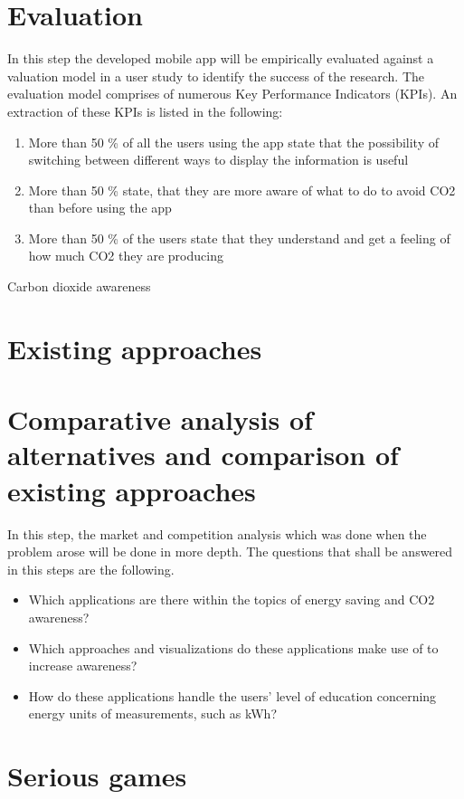 \section{Evaluation}
In this step the developed mobile app will be empirically evaluated against a valuation model in a user study to identify the success of the research. The evaluation model comprises of numerous Key Performance Indicators (KPIs). An extraction of these KPIs is listed in the following:
\begin{enumerate}
	\item More than 50 \% of all the users using the app state that the possibility of switching between different ways to display the information is useful
	\item More than 50 \% state, that they are more aware of what to do to avoid CO2 than before using the app
	\item More than 50 \% of the users state that they understand and get a feeling of how much CO2 they are producing
\end{enumerate}


Carbon dioxide awareness

\cite{mohammadmoradieffectiveness}

\section{Existing approaches}

\section{Comparative analysis of alternatives and comparison of existing approaches}
In this step, the market and competition analysis which was done when the problem arose will be done in more depth. The questions that shall be answered in this steps are the following.
\begin{itemize}
	\item Which applications are there within the topics of energy saving and CO2 awareness?
	\item Which approaches and visualizations do these applications make use of to increase awareness?
	\item How do these applications handle the users' level of education concerning energy units of measurements, such as kWh?
\end{itemize}

\section{Serious games}

